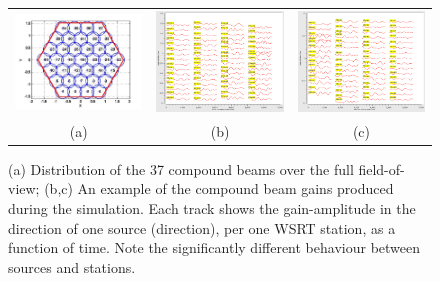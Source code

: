 \documentclass{aps2010} \special{papersize=8.5in,11in}
\begin{document}
\begin{figure}
\begin{tabular}{@{}ccc@{}}
\includegraphics[width=5cm]{ArrangementOfBeams} &
\includegraphics[width=5cm]{inspector_gains1} &
\includegraphics[width=5cm]{inspector_gains2} \\
(a)&(b)&(c)
\end{tabular}
\caption{\label{fig:gains}(a) Distribution of the 37 compound beams over the full field-of-view; (b,c) An example of the compound beam gains produced during the simulation. Each track shows the gain-amplitude in the direction of one source (direction), per one WSRT station, as a function of time. Note the significantly different behaviour between sources and stations.}
\end{figure}
\end{document}
